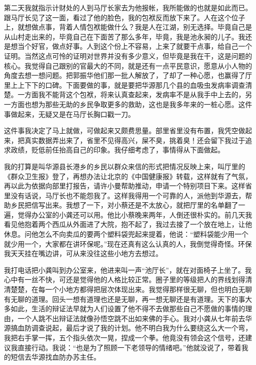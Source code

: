 \documentclass[12pt,oneside]{book}
\begin{document}
第二天我就指示计财处的人到马厅长家去为他报帐，我所能做的也就是如此而已。跟马厅长见了这一面，看过了他的脸色，我的包袱反而放下来了。人在这个位子上，就想做点事，背着人情包袱能做什么？我是人在江湖，别无选择。毕竟自己是从山村走出来的，毕竟自己在下面苦了那么多年，毕竟，我是池永昶的儿子。我还是想当个好官，做点好事。人到这个份上不容易，上来了就要干点事，给自己一个证明。当然这点可怜的证明对世界并没有多少意义，但毕竟是我在干，这是问题的核心。我觉得自己跟别的官最大的不同，就是还有一点平民意识，愿意从小人物的角度去想一想问题。把郭振华他们那一批人解放了，了却了一种心愿，也赢得了厅里上上下下的口碑。下面要做的事，就是要把华源那几个县的血吸虫发病率调查清楚。一方面我不能背这个包袱，将来认真查起来，发病率不是从我手中上去的，另一方面也想为那些无助的乡民争取更多的救助，这也是我多年来的一桩心愿。这件事做起来，无疑又是在马厅长胸口戳一刀。

这件事我决定了马上就做，可做起来又颇费思量。部里省里没有布置，我凭空做起来，把真实数据弄出来了，省里不见得高兴，屎不臭，挑着臭！还会留下我过于追求政绩，贬低前任抬高自己的印象。我仔细考虑了，事情得从下面做起。

我的打算是叫华源县长港乡的乡民以群众来信的形式把情况反映上来，叫厅里的《群众卫生报》登了，再想办法让北京的《中国健康报》转载，这样就有了气氛，再以此为依据向部里打报告，请许小曼帮助推动，申请一个特别项目下来。这样省里没有话说，马厅长也不能怨我了。这样我得用一个可靠的人，派他到华源去，帮助乡民把信写出来。我想了一下，对小蔡还是不太放心，就把厅里的名单翻了一遍，觉得办公室的小龚还可以用。他比小蔡晚来两年，人倒还很朴实的。前几天我看见他抱着两个西瓜从外面进了大院，抱不起了，我过去接了一个放在地上，让他休息。问他怎么不向卖瓜的要两个塑料袋兜起来提着，他说：``塑料袋能少用一个就少用一个，大家都在讲环保呢。''现在还真有这么认真的人，我倒觉得奇怪。环保我天天挂在嘴边讲，可从来没往这些小地方去想过。

我打电话把小龚叫到办公室来，他进来叫一声``池厅长''，就在对面椅子上坐了。我心中有一丝不快，可还是觉得他的人格比较正常。圈子里的等级把人的界线划得清清楚楚，在每一个小地方都得把层次体现出来。我觉得那样很无聊，但也明白无聊有无聊的道理。回头一想有道理也还是无聊，再一想无聊还是有道理。天下的事大多如此，生活的辩证法早就为人们设置了他不得不去做那些自己不愿做的事情的理由，一个人跳不出辩证法就像孙悟空跳不出如来佛的手心。我对小龚从七年前去华源搞血防调查说起，最后才说了我的计划。他不明白我为什么要绕这么大一个弯，我把右手掌一挥，五个指头依次一晃，捏成一个拳。他竟没有领会这个信号，还建议我直接行动。我说：``也是为了照顾一下老领导的情绪吧。''他就没说了，带着我的短信去华源找血防办苏主任。
\end{document}
